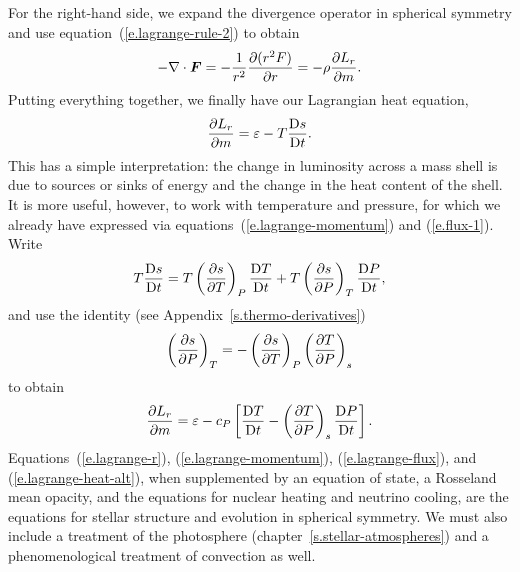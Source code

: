 For the right-hand side, we expand the divergence operator in spherical symmetry and use equation~(\ref{e.lagrange-rule-2}) to obtain
\[
	-\nabla \cdot\boldsymbol{F} = -\frac{1}{r^{2}}\frac{\partial(r^{2} F)}{\partial r} = -\rho\frac{\partial L_{r}}{\partial m}.
\]
Putting everything together, we finally have our Lagrangian heat equation,
\begin{equation}\label{e.lagrange-heat}
	\frac{\partial L_{r}}{\partial m} = \varepsilon - T\frac{\mathrm{D} s}{\mathrm{D} t}.
\end{equation}
This has a simple interpretation: the change in luminosity across a mass shell is due to sources or sinks of energy and the change in the heat content of the shell.  It is more useful, however, to work with temperature and pressure, for which we already have expressed via equations~(\ref{e.lagrange-momentum}) and (\ref{e.flux-1}).  Write
\[
	T\frac{\mathrm{D} s}{\mathrm{D} t} = T\left(\frac{\partial s}{\partial T}\right)_{P}\frac{\mathrm{D} T}{\mathrm{D} t} + T\left(\frac{\partial s}{\partial P}\right)_{T}\frac{\mathrm{D} P}{\mathrm{D} t},
\]
and use the identity (see Appendix~\ref{s.thermo-derivatives})
\[
	\left(\frac{\partial s}{\partial P}\right)_{T} = -\left(\frac{\partial s}{\partial T}\right)_{P}\left(\frac{\partial T}{\partial P}\right)_{s}
\]
to obtain
\begin{equation}\label{e.lagrange-heat-alt}
	\frac{\partial L_{r}}{\partial m} 
	= \varepsilon - c_{P}\left[ \frac{\mathrm{D} T}{\mathrm{D} t} - \left(\frac{\partial T}{\partial P}\right)_{s} \frac{\mathrm{D} P}{\mathrm{D} t}\right].
\end{equation}
Equations~(\ref{e.lagrange-r}), (\ref{e.lagrange-momentum}), (\ref{e.lagrange-flux}), and (\ref{e.lagrange-heat-alt}), when supplemented by an equation of state, a Rosseland mean opacity, and the equations for nuclear heating and neutrino cooling, are the equations for stellar structure and evolution in spherical symmetry. We must also include a treatment of the photosphere (chapter~\ref{s.stellar-atmospheres}) and a phenomenological treatment of convection as well.

